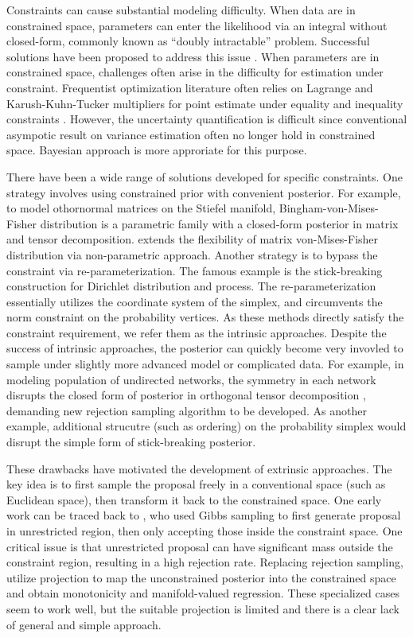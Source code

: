 \documentclass[10pt]{article}
\begin{document}
Constraints can cause substantial modeling difficulty. When data are in constrained space, parameters can enter the likelihood via an integral without closed-form, commonly known as ``doubly intractable'' problem. Successful solutions have been proposed to address this issue \citep{murray2012mcmc,rao2016data}. When parameters are in  constrained space, challenges often arise in the difficulty for estimation under constraint. Frequentist optimization literature often relies on Lagrange and Karush-Kuhn-Tucker multipliers for point estimate under equality and inequality constraints \citep{boyd2004convex}. However, the uncertainty quantification is difficult since conventional asympotic result on variance estimation often no longer hold in constrained space. Bayesian approach is more approriate for this purpose.

There have been a wide range of solutions developed for specific constraints. One strategy involves using constrained prior with convenient posterior. For example, to model othornormal matrices on the Stiefel manifold, Bingham-von-Mises-Fisher distribution \citep{khatri1977mises,hoff2009simulation} is a parametric family with a closed-form posterior in matrix and tensor decomposition. \cite{lin2016bayesstiefel} extends the flexibility of matrix von-Mises-Fisher distribution via non-parametric approach. Another strategy is to bypass the constraint via re-parameterization. The famous example is the stick-breaking construction for Dirichlet distribution and process. The re-parameterization essentially utilizes the coordinate system of the simplex, and circumvents the norm constraint on the probability vertices. As these methods directly satisfy the constraint requirement, we refer them as the intrinsic approaches. Despite the success of intrinsic approaches, the posterior can quickly become very invovled to sample under slightly more advanced model or complicated data. For example, in modeling population of undirected networks, the symmetry in each network disrupts the closed form of posterior in orthogonal tensor decomposition \citep{hoff2016equivariant}, demanding new rejection sampling algorithm to be developed. As another example, additional strucutre (such as ordering) on the probability simplex would disrupt the simple form of stick-breaking posterior.

These drawbacks have motivated the development of extrinsic approaches. The key idea is to first sample the proposal freely in a conventional space (such as Euclidean space), then transform it back to the constrained space. One early work can be traced back to \cite{gelfand1992bayesian}, who used Gibbs sampling to first generate proposal in unrestricted region, then only accepting those inside the constraint space. One critical issue is that unrestricted proposal can have significant mass outside the constraint region, resulting in a high rejection rate. Replacing rejection sampling, \cite{lin2014monogp,lin2016extrinsic} utilize projection to map the unconstrained posterior into the constrained space and obtain monotonicity and manifold-valued regression. These specialized cases seem to work well, but the suitable projection is limited and there is a clear lack of general and simple approach.
\end{document}
